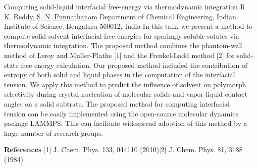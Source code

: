 
    \begin{abstract_online}{Computing solid-liquid interfacial free-energy via thermodynamic integration}{%
        R. K. Reddy, \underline{S. N. Punnathanam}}{%
        \IStag}{%
        Department of Chemical Engineering, Indian Institute of Science, Bengaluru 560012, India}
    In this talk, we present a method to compute solid-solvent interfacial free-energies for sparingly soluble solutes via thermodynamic integration. The proposed method combines the phantom-wall method of Leroy and Muller-Plathe [1] and the Frenkel-Ladd method [2] for solid-state free energy calculation. Our proposed method included the contribution of entropy of both solid and liquid phases in the computation of the interfacial tension. We apply this method to predict the influence of solvent on polymorph selectivity during crystal nucleation of molecular solids and vapor-liquid contact angles on a solid subtrate. The proposed method for computing interfacial tension can be easily implemented using the open-source molecular dynamics package LAMMPS. This can facilitate widespread adoption of this method by a large number of research groups. 
    
        \textbf{References} \newline{}[1] J. Chem. Phys. 133, 044110 (2010)\newline{}[2] J. Chem. Phys. 81, 3188 (1984)
    \end{abstract_online}
    
